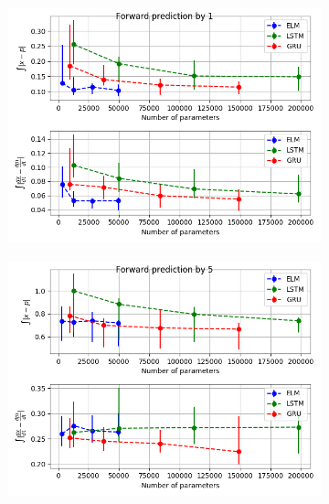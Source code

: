 \documentclass[11pt]{article}
\begin{document}
  \begin{figure}
    \begin{center}
   \begin{subfigure}{.48\textwidth}
     \includegraphics[width=\textwidth]{figures/mg2_scatter_1.png}
     \caption{}
   \end{subfigure}
   \begin{subfigure}{.48\textwidth}
     \includegraphics[width=\textwidth]{figures/mg2_scatter_5.png}
     \caption{}
   \end{subfigure}
   \begin{subfigure}{.48\textwidth}

\end{subfigure}
\end{center}
\end{figure}
\end{document}
